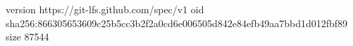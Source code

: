 version https://git-lfs.github.com/spec/v1
oid sha256:866305653609c25b5cc3b2f2a0cd6e006505d842e84efb49aa7bbd1d012fbf89
size 87544
